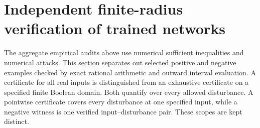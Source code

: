 \section{Independent finite-radius verification of trained networks}
\label{sec:verified-trained-networks}
The aggregate empirical audits above use numerical sufficient inequalities and numerical attacks.  This section separates out selected positive and negative examples checked by exact rational arithmetic and outward interval evaluation.  A certificate for all real inputs is distinguished from an exhaustive certificate on a specified finite Boolean domain.  Both quantify over every allowed disturbance.  A pointwise certificate covers every disturbance at one specified input, while a negative witness is one verified input--disturbance pair.  These scopes are kept distinct.








